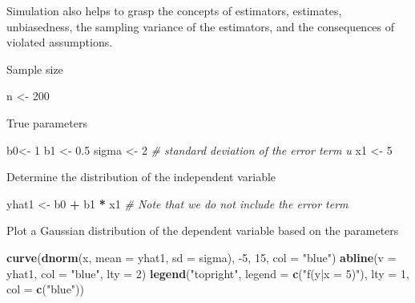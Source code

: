 \documentclass[]{book}
\newenvironment{Shaded}{\begin{snugshade}}{\end{snugshade}}
\newcommand{\CommentTok}[1]{\textcolor[rgb]{0.56,0.35,0.01}{\textit{#1}}}
\newcommand{\DataTypeTok}[1]{\textcolor[rgb]{0.13,0.29,0.53}{#1}}
\newcommand{\DecValTok}[1]{\textcolor[rgb]{0.00,0.00,0.81}{#1}}
\newcommand{\FloatTok}[1]{\textcolor[rgb]{0.00,0.00,0.81}{#1}}
\newcommand{\KeywordTok}[1]{\textcolor[rgb]{0.13,0.29,0.53}{\textbf{#1}}}
\newcommand{\NormalTok}[1]{#1}
\newcommand{\OperatorTok}[1]{\textcolor[rgb]{0.81,0.36,0.00}{\textbf{#1}}}
\newcommand{\StringTok}[1]{\textcolor[rgb]{0.31,0.60,0.02}{#1}}
\begin{document}
Simulation also helps to grasp the concepts of estimators, estimates, unbiasedness, the sampling variance of the estimators, and the consequences of violated assumptions.

Sample size

\begin{Shaded}
\begin{Highlighting}[]
\NormalTok{n <-}\StringTok{ }\DecValTok{200}
\end{Highlighting}
\end{Shaded}

True parameters

\begin{Shaded}
\begin{Highlighting}[]
\NormalTok{b0<-}\StringTok{ }\DecValTok{1}
\NormalTok{b1 <-}\StringTok{ }\FloatTok{0.5}
\NormalTok{sigma <-}\StringTok{ }\DecValTok{2} \CommentTok{# standard deviation of the error term u }
\NormalTok{x1 <-}\StringTok{ }\DecValTok{5}
\end{Highlighting}
\end{Shaded}

Determine the distribution of the independent variable

\begin{Shaded}
\begin{Highlighting}[]
\NormalTok{yhat1 <-}\StringTok{ }\NormalTok{b0 }\OperatorTok{+}\StringTok{ }\NormalTok{b1 }\OperatorTok{*}\StringTok{ }\NormalTok{x1 }\CommentTok{#  Note that we do not include the error term }
\end{Highlighting}
\end{Shaded}

Plot a Gaussian distribution of the dependent variable based on the parameters

\begin{Shaded}
\begin{Highlighting}[]
\KeywordTok{curve}\NormalTok{(}\KeywordTok{dnorm}\NormalTok{(x, }\DataTypeTok{mean =}\NormalTok{ yhat1, }\DataTypeTok{sd =}\NormalTok{ sigma), }\DecValTok{-5}\NormalTok{, }\DecValTok{15}\NormalTok{, }\DataTypeTok{col =} \StringTok{"blue"}\NormalTok{)}
\KeywordTok{abline}\NormalTok{(}\DataTypeTok{v =}\NormalTok{ yhat1, }\DataTypeTok{col =} \StringTok{"blue"}\NormalTok{, }\DataTypeTok{lty =} \DecValTok{2}\NormalTok{)}
\KeywordTok{legend}\NormalTok{(}\StringTok{"topright"}\NormalTok{, }\DataTypeTok{legend =} \KeywordTok{c}\NormalTok{(}\StringTok{"f(y|x = 5)"}\NormalTok{), }\DataTypeTok{lty =} \DecValTok{1}\NormalTok{, }\DataTypeTok{col =} \KeywordTok{c}\NormalTok{(}\StringTok{"blue"}\NormalTok{))}
\end{Highlighting}
\end{Shaded}
\end{document}
